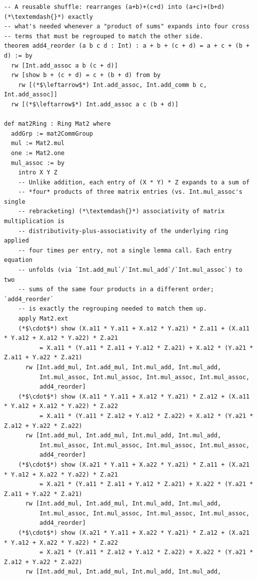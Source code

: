 \begin{lstlisting}
-- A reusable shuffle: rearranges (a+b)+(c+d) into (a+c)+(b+d) (*\textemdash{}*) exactly
-- what's needed whenever a "product of sums" expands into four cross
-- terms that must be regrouped to match the other side.
theorem add4_reorder (a b c d : Int) : a + b + (c + d) = a + c + (b + d) := by
  rw [Int.add_assoc a b (c + d)]
  rw [show b + (c + d) = c + (b + d) from by
    rw [(*$\leftarrow$*) Int.add_assoc, Int.add_comm b c, Int.add_assoc]]
  rw [(*$\leftarrow$*) Int.add_assoc a c (b + d)]

def mat2Ring : Ring Mat2 where
  addGrp := mat2CommGroup
  mul := Mat2.mul
  one := Mat2.one
  mul_assoc := by
    intro X Y Z
    -- Unlike addition, each entry of (X * Y) * Z expands to a sum of
    -- *four* products of three matrix entries (vs. Int.mul_assoc's single
    -- rebracketing) (*\textemdash{}*) associativity of matrix multiplication is
    -- distributivity-plus-associativity of the underlying ring applied
    -- four times per entry, not a single lemma call. Each entry equation
    -- unfolds (via `Int.add_mul`/`Int.mul_add`/`Int.mul_assoc`) to two
    -- sums of the same four products in a different order; `add4_reorder`
    -- is exactly the regrouping needed to match them up.
    apply Mat2.ext
    (*$\cdot$*) show (X.a11 * Y.a11 + X.a12 * Y.a21) * Z.a11 + (X.a11 * Y.a12 + X.a12 * Y.a22) * Z.a21
          = X.a11 * (Y.a11 * Z.a11 + Y.a12 * Z.a21) + X.a12 * (Y.a21 * Z.a11 + Y.a22 * Z.a21)
      rw [Int.add_mul, Int.add_mul, Int.mul_add, Int.mul_add,
          Int.mul_assoc, Int.mul_assoc, Int.mul_assoc, Int.mul_assoc,
          add4_reorder]
    (*$\cdot$*) show (X.a11 * Y.a11 + X.a12 * Y.a21) * Z.a12 + (X.a11 * Y.a12 + X.a12 * Y.a22) * Z.a22
          = X.a11 * (Y.a11 * Z.a12 + Y.a12 * Z.a22) + X.a12 * (Y.a21 * Z.a12 + Y.a22 * Z.a22)
      rw [Int.add_mul, Int.add_mul, Int.mul_add, Int.mul_add,
          Int.mul_assoc, Int.mul_assoc, Int.mul_assoc, Int.mul_assoc,
          add4_reorder]
    (*$\cdot$*) show (X.a21 * Y.a11 + X.a22 * Y.a21) * Z.a11 + (X.a21 * Y.a12 + X.a22 * Y.a22) * Z.a21
          = X.a21 * (Y.a11 * Z.a11 + Y.a12 * Z.a21) + X.a22 * (Y.a21 * Z.a11 + Y.a22 * Z.a21)
      rw [Int.add_mul, Int.add_mul, Int.mul_add, Int.mul_add,
          Int.mul_assoc, Int.mul_assoc, Int.mul_assoc, Int.mul_assoc,
          add4_reorder]
    (*$\cdot$*) show (X.a21 * Y.a11 + X.a22 * Y.a21) * Z.a12 + (X.a21 * Y.a12 + X.a22 * Y.a22) * Z.a22
          = X.a21 * (Y.a11 * Z.a12 + Y.a12 * Z.a22) + X.a22 * (Y.a21 * Z.a12 + Y.a22 * Z.a22)
      rw [Int.add_mul, Int.add_mul, Int.mul_add, Int.mul_add,

\end{lstlisting}
